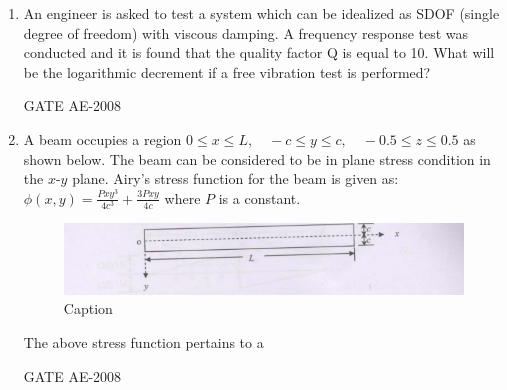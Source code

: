 \documentclass[journal,12pt,onecolumn]{IEEEtran}
\theoremstyle{remark}
\begin{document}
\begin{enumerate}
\quad

\item  An engineer is asked to test a system which can be idealized as SDOF (single degree of freedom) with viscous damping. A frequency response test was conducted and it is found that the quality factor Q is equal to 10. What will be the logarithmic decrement if a free vibration test is performed?\\
\begin{enumerate}
\end{enumerate}
\hfill{GATE AE-2008}

\quad

\item A beam occupies a region 
$
0 \leq x \leq L, \quad -c \leq y \leq c, \quad -0.5 \leq z \leq 0.5
$
as shown below. The beam can be considered to be in plane stress condition in the $x\text{-}y$ plane.  
Airy's stress function for the beam is given as:
$
\phi(x,y) = \frac{Pxy^{3}}{4c^{3}} + \frac{3Pxy}{4c}
$
where $P$ is a constant.
\begin{figure}[H]
    \centering
    \includegraphics[width=0.5\linewidth]{figs/Screenshot from 2025-08-08 14-58-40.png}
    \caption{Caption}
    \label{fig:placeholder}
\end{figure}
The above stress function pertains to a \\
\begin{enumerate}
\end{enumerate}
\hfill{GATE AE-2008}


\end{enumerate}
\end{document}
